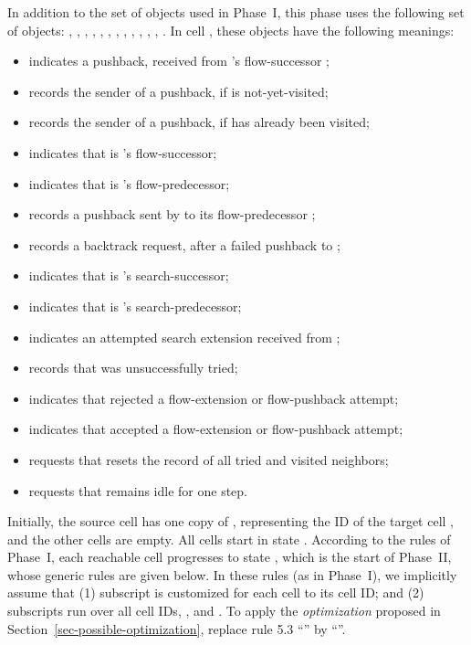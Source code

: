 \documentclass[preliminary,copyright,creativecommons]{eptcs}
\theoremstyle{remark}
\begin{document}
In addition to the set of objects used in Phase~I,
this phase uses the following set of objects:
, , , , , , , 
, , , , , .
In cell , these objects have the following meanings:
\begin{itemize}
\item  indicates a pushback, received from 's flow-successor ;

\item  records the sender of a pushback, if  is not-yet-visited;

\item  records the sender of a pushback, if  has already been visited;

\item  indicates that  is 's flow-successor;

\item  indicates that  is 's flow-predecessor;

\item  records a pushback sent by  to its flow-predecessor ;

\item  records a backtrack request, after a failed pushback to ;

\item  indicates that  is 's search-successor;

\item  indicates that  is 's search-predecessor;

\item  indicates an attempted search extension received from ;

\item  records that  was unsuccessfully tried;

\item  indicates that  rejected a flow-extension or flow-pushback attempt;

\item  indicates that  accepted a flow-extension or flow-pushback attempt;

\item  requests that  resets the record of all tried and visited neighbors;

\item  requests that  remains idle for one step.
\end{itemize}

Initially, the source cell  has one copy of , 
representing the ID of the target cell ,
and the other cells are empty.
All cells start in state .
According to the rules of Phase~I, 
each reachable cell progresses to state ,
which is the start of Phase~II, whose generic rules are given below.
In these rules (as in Phase~I), we implicitly assume that
(1) subscript  is customized for each cell to its cell ID;
and (2) subscripts  run over all cell IDs, ,
and .
To apply the \emph{optimization} proposed in Section~\ref{sec-possible-optimization}, 
replace rule 5.3 ``'' by 
``''.
\end{document}
